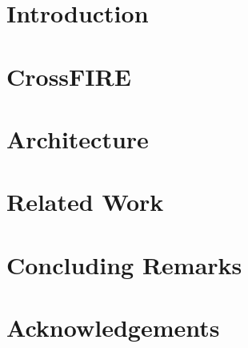 \documentclass[12pt]{article}
\title{\papertitle}
\author{Rafael S. Durelli\inst{1}, Thiago Gottardi\inst{2} and Valter V. de Camargo\inst{2}}
\begin{document}
 

\maketitle



\section{Introduction\label{sec:introduction}}
 

% 

\section{CrossFIRE\label{sec:proline}} 


%	


\section{Architecture\label{sec:architecture}}
 

\section{Related Work\label{sec:related}}
 

\section{Concluding Remarks\label{sec:conclusion}}
 

\section{Acknowledgements}
 



\end{document}
